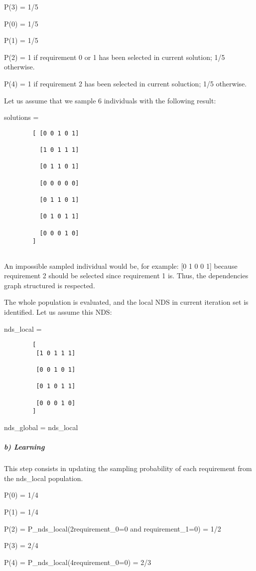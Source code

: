\documentclass[11pt]{article}
\begin{document}
P(3) = 1/5

P(0) = 1/5

P(1) = 1/5

P(2) = 1 if requirement 0 or 1 has been selected in current solution;
1/5 otherwise.

P(4) = 1 if requirement 2 has been selected in current soluction; 1/5
otherwise.

Let us assume that we sample 6 individuals with the following result:

solutions =

\begin{verbatim}
        [ [0 0 1 0 1]

          [1 0 1 1 1]

          [0 1 1 0 1]

          [0 0 0 0 0]

          [0 1 1 0 1]
          
          [0 1 0 1 1]

          [0 0 0 1 0]
        ]
        
\end{verbatim}

An impossible sampled individual would be, for example: {[}0 1 0 0 1{]}
because requirement 2 should be selected since requirement 1 is. Thus,
the dependencies graph structured is respected.

The whole population is evaluated, and the local NDS in current
iteration set is identified. Let us assume this NDS:

nds\_local =

\begin{verbatim}
        [
         [1 0 1 1 1]

         [0 0 1 0 1]

         [0 1 0 1 1]

         [0 0 0 1 0]
        ]
\end{verbatim}

nds\_global = nds\_local

\subparagraph{b) Learning}\label{b-learning}

This step consists in updating the sampling probability of each
requirement from the nds\_local population.

P(0) = 1/4

P(1) = 1/4

P(2) = P\_nds\_local(2\textbar{}requirement\_0=0 and requirement\_1=0) =
1/2

P(3) = 2/4

P(4) = P\_nds\_local(4\textbar{}requirement\_0=0) = 2/3
\end{document}
